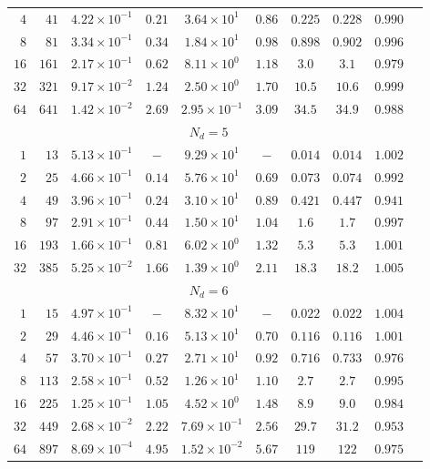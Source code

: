 \begin{table}[htbp]
\begin{tabular}{rr ccc cc cc c}
$4$ & $41$ & $4.22\times 10^{-1}$ & $0.21$ & $3.64\times 10^{1}$ & $0.86$ & $0.225$ & $0.228$ & $0.990$ \\
$8$ & $81$ & $3.34\times 10^{-1}$ & $0.34$ & $1.84\times 10^{1}$ & $0.98$ & $0.898$ & $0.902$ & $0.996$ \\
$16$ & $161$ & $2.17\times 10^{-1}$ & $0.62$ & $8.11\times 10^{0}$ & $1.18$ & $3.0$ & $3.1$ & $0.979$ \\
$32$ & $321$ & $9.17\times 10^{-2}$ & $1.24$ & $2.50\times 10^{0}$ & $1.70$ & $10.5$ & $10.6$ & $0.999$ \\
$64$ & $641$ & $1.42\times 10^{-2}$ & $2.69$ & $2.95\times 10^{-1}$ & $3.09$ & $34.5$ & $34.9$ & $0.988$ \\
\midrule
\multicolumn{9}{c}{\textbf{$N_d = 5$}} \\
\midrule
$1$ & $13$ & $5.13\times 10^{-1}$ & $-$ & $9.29\times 10^{1}$ & $-$ & $0.014$ & $0.014$ & $1.002$ \\
$2$ & $25$ & $4.66\times 10^{-1}$ & $0.14$ & $5.76\times 10^{1}$ & $0.69$ & $0.073$ & $0.074$ & $0.992$ \\
$4$ & $49$ & $3.96\times 10^{-1}$ & $0.24$ & $3.10\times 10^{1}$ & $0.89$ & $0.421$ & $0.447$ & $0.941$ \\
$8$ & $97$ & $2.91\times 10^{-1}$ & $0.44$ & $1.50\times 10^{1}$ & $1.04$ & $1.6$ & $1.7$ & $0.997$ \\
$16$ & $193$ & $1.66\times 10^{-1}$ & $0.81$ & $6.02\times 10^{0}$ & $1.32$ & $5.3$ & $5.3$ & $1.001$ \\
$32$ & $385$ & $5.25\times 10^{-2}$ & $1.66$ & $1.39\times 10^{0}$ & $2.11$ & $18.3$ & $18.2$ & $1.005$ \\
\midrule
\multicolumn{9}{c}{\textbf{$N_d = 6$}} \\
\midrule
$1$ & $15$ & $4.97\times 10^{-1}$ & $-$ & $8.32\times 10^{1}$ & $-$ & $0.022$ & $0.022$ & $1.004$ \\
$2$ & $29$ & $4.46\times 10^{-1}$ & $0.16$ & $5.13\times 10^{1}$ & $0.70$ & $0.116$ & $0.116$ & $1.001$ \\
$4$ & $57$ & $3.70\times 10^{-1}$ & $0.27$ & $2.71\times 10^{1}$ & $0.92$ & $0.716$ & $0.733$ & $0.976$ \\
$8$ & $113$ & $2.58\times 10^{-1}$ & $0.52$ & $1.26\times 10^{1}$ & $1.10$ & $2.7$ & $2.7$ & $0.995$ \\
$16$ & $225$ & $1.25\times 10^{-1}$ & $1.05$ & $4.52\times 10^{0}$ & $1.48$ & $8.9$ & $9.0$ & $0.984$ \\
$32$ & $449$ & $2.68\times 10^{-2}$ & $2.22$ & $7.69\times 10^{-1}$ & $2.56$ & $29.7$ & $31.2$ & $0.953$ \\
$64$ & $897$ & $8.69\times 10^{-4}$ & $4.95$ & $1.52\times 10^{-2}$ & $5.67$ & $119$ & $122$ & $0.975$ \\
\bottomrule
\end{tabular}
\end{table}